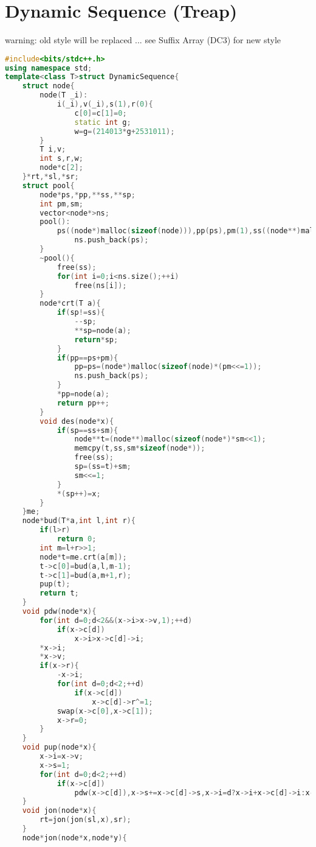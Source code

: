\documentclass{book}
\begin{document}
\section{Dynamic Sequence (Treap)}
warning: old style will be replaced ... see Suffix Array (DC3) for new style\begin{lstlisting}[language=C++,title={Dynamic Sequence (Treap).hpp (4119 bytes, 177 lines)}]
#include<bits/stdc++.h>
using namespace std;
template<class T>struct DynamicSequence{
    struct node{
        node(T _i):
            i(_i),v(_i),s(1),r(0){
                c[0]=c[1]=0;
                static int g;
                w=g=(214013*g+2531011);
        }
        T i,v;
        int s,r,w;
        node*c[2];
    }*rt,*sl,*sr;
    struct pool{
        node*ps,*pp,**ss,**sp;
        int pm,sm;
        vector<node*>ns;
        pool():
            ps((node*)malloc(sizeof(node))),pp(ps),pm(1),ss((node**)malloc(sizeof(node*))),sp(ss),sm(1){
                ns.push_back(ps);
        }
        ~pool(){
            free(ss);
            for(int i=0;i<ns.size();++i)
                free(ns[i]);
        }
        node*crt(T a){
            if(sp!=ss){
                --sp;
                **sp=node(a);
                return*sp;
            }
            if(pp==ps+pm){
                pp=ps=(node*)malloc(sizeof(node)*(pm<<=1));
                ns.push_back(ps);
            }
            *pp=node(a);
            return pp++;
        }
        void des(node*x){
            if(sp==ss+sm){
                node**t=(node**)malloc(sizeof(node*)*sm<<1);
                memcpy(t,ss,sm*sizeof(node*));
                free(ss);
                sp=(ss=t)+sm;
                sm<<=1;
            }
            *(sp++)=x;
        }
    }me;
    node*bud(T*a,int l,int r){
        if(l>r)
            return 0;
        int m=l+r>>1;
        node*t=me.crt(a[m]);
        t->c[0]=bud(a,l,m-1);
        t->c[1]=bud(a,m+1,r);
        pup(t);
        return t;
    }
    void pdw(node*x){
        for(int d=0;d<2&&(x->i>x->v,1);++d)
            if(x->c[d])
                x->i>x->c[d]->i;
        *x->i;
        *x->v;
        if(x->r){
            -x->i;
            for(int d=0;d<2;++d)
                if(x->c[d])
                    x->c[d]->r^=1;
            swap(x->c[0],x->c[1]);
            x->r=0;
        }
    }
    void pup(node*x){
        x->i=x->v;
        x->s=1;
        for(int d=0;d<2;++d)
            if(x->c[d])
                pdw(x->c[d]),x->s+=x->c[d]->s,x->i=d?x->i+x->c[d]->i:x->c[d]->i+x->i;
    }
    void jon(node*x){
        rt=jon(jon(sl,x),sr);
    }
    node*jon(node*x,node*y){

\end{lstlisting}
\end{document}

